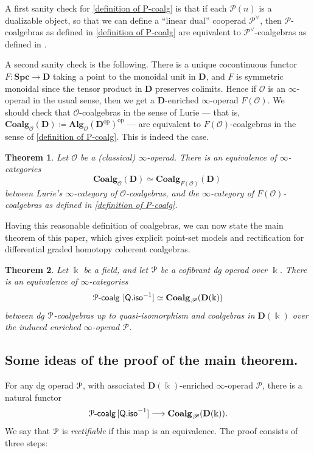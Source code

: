 \documentclass[a4paper,12pt]{amsart}
\renewcommand{\mathcal}{\EuScript}
\newtheorem{theoremintro}{Theorem}
\newcommand{\onepcoalg}{\mathcal{P}\text{-}\mathsf{coalg}}
\theoremstyle{plain}
\theoremstyle{definition}
\theoremstyle{remark}
\newcommand{\kk}{\Bbbk}
\begin{document}
A first sanity check for \cref{definition of P-coalg} is that if each $\mathscr P(n)$ is a dualizable object, so that we can define a ``linear dual'' cooperad $\mathscr P^\vee$, then $\mathscr P$-coalgebras as defined in \cref{definition of P-coalg} are equivalent to $\mathscr P^\vee$-coalgebras as defined in \cite[Appendix A]{heuts2024}.

	A second sanity check is the following. There is a unique cocontinuous functor $F : \mathbf{Spc}\longrightarrow \mathbf D$ taking a point to the monoidal unit in $\mathbf D$, and $F$ is symmetric monoidal since the tensor product in $\mathbf D$ preserves colimits. Hence if $\mathscr O$ is an $\infty$-operad in the usual sense, then we get a $\mathbf D$-enriched $\infty$-operad $F(\mathscr O)$. We should check that $\mathscr O$-coalgebras in the sense of Lurie --- that is, $\mathbf{Coalg}_{\mathscr{O}}(\mathbf{D}) \coloneqq \mathbf{Alg}_{\mathscr{O}}(\mathbf{D}^{\mathrm{op}})^{\mathrm{op}}$ --- are equivalent to $F(\mathscr O)$-coalgebras in the sense of \cref{definition of P-coalg}. This is indeed the case.
    
\begin{theoremintro}
Let $\mathscr{O}$ be a (classical) $\infty$-operad. There is an equivalence of $\infty$-categories
\[
\mathbf{Coalg}_{\mathscr{O}}(\mathbf{D}) \simeq \mathbf{Coalg}_{F(\mathscr{O})}(\mathbf{D})~
\]
between Lurie's $\infty$-category of $\mathscr{O}$-coalgebras, and the $\infty$-category of $F(\mathscr{O})$-coalgebras as defined in \cref{definition of P-coalg}.
\end{theoremintro}

Having this reasonable definition of coalgebras, we can now state the main theorem of this paper, which gives explicit point-set models and rectification for differential graded homotopy coherent coalgebras.

\begin{theoremintro}\label{thm: introrectification}
Let $\kk$ be a field, and let $\mathcal{P}$ be a cofibrant dg operad over $\kk$. There is an equivalence of $\infty$-categories
\[
\mathcal{P}\text{-}\mathsf{coalg}~[\mathsf{Q.iso}^{-1}] \simeq \mathbf{Coalg}_{\mathscr{P}}(\mathbf{D}(\kk))
\]
between dg $\mathcal{P}$-coalgebras up to quasi-isomorphism and coalgebras in $\mathbf{D}(\kk)$ over the induced enriched $\infty$-operad $\mathscr{P}$. 
\end{theoremintro}


\subsection{Some ideas of the proof of the main theorem.}
For any dg operad $\mathcal P$, with associated $\mathbf D(\kk)$-enriched $\infty$-operad $\mathscr P$, there is a natural functor 
\[ \onepcoalg\,[\mathsf{Q.iso}^{-1}] \longrightarrow \mathbf{Coalg}_{\mathscr{P}}(\mathbf{D}(\kk)).\]	
We say that $\mathcal P$ is \emph{rectifiable}  if this map is an equivalence. The proof consists of three steps:
\end{document}
